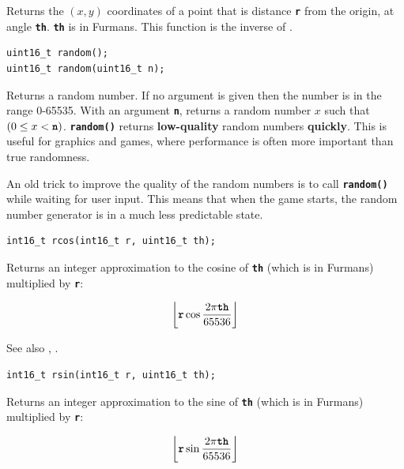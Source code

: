 \documentclass[10pt]{book}
\newcommand{\mach}[1]{\texttt{\textbf{#1}}}
\begin{document}
\begin{CJK}{UTF8}{gkai}
Returns the $(x,y)$ coordinates of a point that is distance \mach{r} from the origin,
at angle \mach{th}.
\mach{th} is in Furmans.
This function is the inverse of .


\begin{framed}
\begin{verbatim}
uint16_t random();
uint16_t random(uint16_t n);
\end{verbatim}
\end{framed}

Returns a random number. If no argument is given then the number is in the range 0-65535.
With an argument \mach{n}, returns a random number $x$ such that $(0 \le x < \mach{n})$.
\mach{random()} returns \textbf{low-quality} random numbers \textbf{quickly}.
This is useful for graphics and games, where performance is often more important than true randomness.

An old trick to improve the quality of the random numbers is to call \mach{random()} while waiting 
for user input.
This means that when the game starts, the random number generator is in a much less predictable state.

\newpage
{}

\begin{framed}
\begin{verbatim}
int16_t rcos(int16_t r, uint16_t th);
\end{verbatim}
\end{framed}

Returns an integer approximation to the cosine of \mach{th} (which is in Furmans) multiplied by \mach{r}:

\[
  \left\lfloor \mach{r} \cos \frac{2 \pi \mach{th}}{65536} \right\rfloor
\]

\noindent
See also , .


\begin{framed}
\begin{verbatim}
int16_t rsin(int16_t r, uint16_t th);
\end{verbatim}
\end{framed}

Returns an integer approximation to the sine of \mach{th} (which is in Furmans) multiplied by \mach{r}:

\[
  \left\lfloor \mach{r} \sin \frac{2 \pi \mach{th}}{65536} \right\rfloor
\]


\end{CJK}
\end{document}

